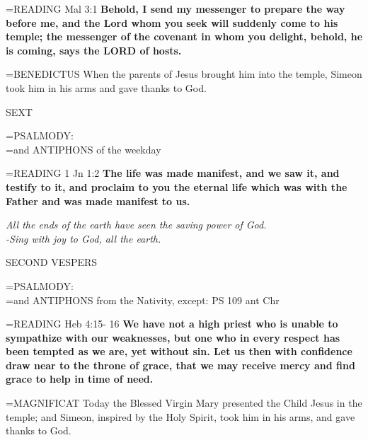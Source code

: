 \hangindent=\parindent \small{READING} Mal 3:1 \textbf{Behold, I send my messenger to prepare the way before me, and the Lord whom you seek will suddenly come to his temple; the messenger of the covenant in whom you delight, behold, he is coming, says the LORD of hosts.\\}
 
\hangindent=\parindent \small{BENEDICTUS  When the parents of Jesus brought him into the temple, Simeon took him in his arms and gave thanks to God.\\}
 
\begin{flushleft}\normalsize SEXT\\\end{flushleft}

\hangindent=\parindent \small{PSALMODY:}\\
\hangindent=\parindent  and ANTIPHONS of the weekday\vspace{0.5em}

\hangindent=\parindent \small{READING} 1 Jn 1:2 \textbf{The life was made manifest, and we saw it, and testify to it, and proclaim to you the eternal life which was with the Father and was made manifest to us.}
 
\begin{center}
\textit{All the ends of the earth have seen the saving power of God.\\
-Sing with joy to God, all the earth.}
\end{center}

\begin{flushleft}\normalsize SECOND VESPERS\\\end{flushleft}

\hangindent=\parindent \small{PSALMODY:}\\
\hangindent=\parindent  and ANTIPHONS from the Nativity, except: PS 109 ant Chr\vspace{0.5em}

\hangindent=\parindent \small{READING} Heb 4:15- 16 \textbf{We have not a high priest who is unable to sympathize with our weaknesses, but one who in every respect has been tempted as we are, yet without sin. Let us then with confidence draw near to the throne of grace, that we may receive mercy and find grace to help in time of need.\\}
 
\hangindent=\parindent \small{MAGNIFICAT  Today the Blessed Virgin Mary presented the Child Jesus in the temple; and Simeon, inspired by the Holy Spirit, took him in his arms, and gave thanks to God.\\}
 

